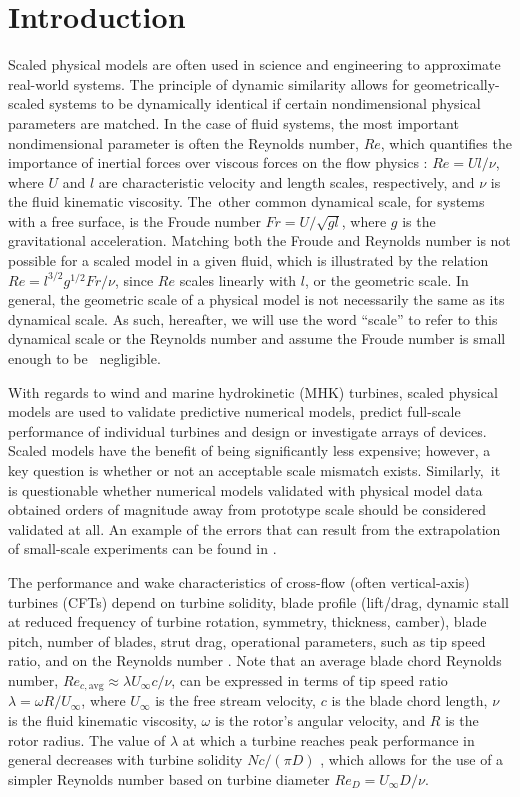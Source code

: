 \documentclass[energies,article,accept,moreauthors,pdftex,10pt,a4paper]{mdpi}
\theoremstyle{mdpi}
\newcounter{ex}
\newcounter{re}
\begin{document}
\section{Introduction}

Scaled physical models are often used in science and engineering to approximate
real-world systems. The principle of dynamic similarity allows for
geometrically-scaled systems to be dynamically identical if certain
nondimensional physical parameters are matched. In the case of fluid systems,
the most important nondimensional parameter is often the Reynolds number, $Re$,
which quantifies the importance of inertial forces over viscous forces on the
flow physics \cite{Acheson1990}: $Re = Ul/\nu$, where $U$ and $l$ are
characteristic velocity and length scales, respectively, and $\nu$ is the fluid
kinematic viscosity. The~other common dynamical scale, for systems with a free
surface, is the Froude number $Fr = U/\sqrt{gl}$, where $g$ is the gravitational
acceleration. Matching both the Froude and Reynolds number is not possible for a
scaled model in a given fluid, which is illustrated by the relation $Re =
l^{3/2} g^{1/2} Fr / \nu$, since $Re$ scales linearly with $l$, or the geometric
scale. In general, the geometric scale of a physical model is not necessarily
the same as its dynamical scale. As such, hereafter, we will use the word
``scale'' to refer to this dynamical scale or the Reynolds number and assume the
Froude number is small enough to be~ negligible.

With regards to wind and marine hydrokinetic (MHK) turbines, scaled physical
models are used to validate predictive numerical models, predict full-scale
performance of individual turbines and design or investigate arrays of devices.
Scaled models have the benefit of being significantly less expensive; however, a
key question is whether or not an acceptable scale mismatch exists.
Similarly,~it is questionable whether numerical models validated with physical
model data obtained orders of magnitude away from prototype scale should be
considered validated at all. An example of the errors that can result from the
extrapolation of small-scale experiments can be found in \cite{Baker1991}.

The performance and wake characteristics of cross-flow (often vertical-axis)
turbines (CFTs) depend on turbine solidity, blade profile (lift/drag, dynamic
stall at reduced frequency of turbine rotation, symmetry, thickness, camber),
blade pitch, number of blades, strut drag, operational parameters, such as tip
speed ratio, and on the Reynolds number \cite{Para2002}. Note that an average
blade chord Reynolds number, $Re_{c,\mathrm{avg}} \approx \lambda U_\infty c/
\nu$, can be expressed in terms of tip speed ratio $\lambda = \omega R/
U_\infty$, where $U_\infty$ is the free stream velocity, $c$ is the blade chord
length, $\nu$ is the fluid kinematic viscosity, $\omega$ is the rotor's angular
velocity, and $R$ is the rotor radius. The value of $\lambda$ at which a turbine
reaches peak performance in general decreases with turbine solidity $Nc/(\pi D)$
\cite{Templin1974}, which allows for the use of a simpler Reynolds number based
on turbine diameter $Re_D = U_\infty D/\nu$.
\end{document}
